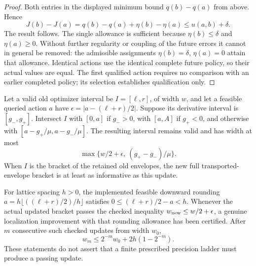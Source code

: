 \begin{proof}
Both entries in the displayed minimum bound $q(b)-q(a)$ from
above.  Hence
\[
 J(b)-J(a)=q(b)-q(a)+\eta(b)-\eta(a)
          \le u(a,b)+\delta.
\]
The result follows.  The single allowance is sufficient because
$\eta(b)\le\delta$ and $\eta(a)\ge0$.  Without further regularity
or coupling of the future errors it cannot in general be removed:
the admissible assignments $\eta(b)=\delta$, $\eta(a)=0$ attain
that allowance.  Identical actions use the identical complete
future policy, so their actual values are equal.  The first
qualified action requires no comparison with an earlier completed
policy; its selection establishes qualification only.
\end{proof}

\begin{lemma}
\label{lem:roundstop126}
Let a valid old optimizer interval be $I=[\ell,r]$, of width $w$,
and let a feasible queried action $a$ have
$\epsilon=|a-(\ell+r)/2|$.  Suppose its derivative interval is
$[g_-,g_+]$.  Intersect $I$ with $[0,a]$ if $g_->0$, with
$[a,A]$ if $g_+<0$, and otherwise with
$[a-g_+/\mu,a-g_-/\mu]$.  The resulting interval remains valid
and has width at most
\begin{equation}\label{eq:roundedprogress126}
 \max\{w/2+\epsilon,\ (g_+-g_-)/\mu\}.
\end{equation}
When $I$ is the bracket of the retained old envelopes, the new full
transported-envelope bracket is at least as informative as this update.

For lattice spacing $h>0$, the implemented feasible downward rounding
$a=h\lfloor ((\ell+r)/2)/h\rfloor$ satisfies
$0\le(\ell+r)/2-a<h$.  Whenever the actual updated bracket passes
the checked inequality $w_{\rm new}\le w/2+\epsilon$, a genuine
localization improvement with that rounding allowance has been
certified.  After $m$ consecutive such checked updates from width
$w_0$,
\[
 w_m\le 2^{-m}w_0+2h(1-2^{-m}).
\]
These statements do not assert that a finite prescribed precision
ladder must produce a passing update.
\end{lemma}

